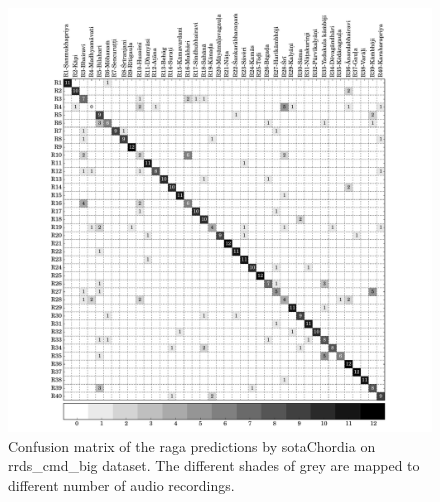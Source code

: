 \begin{figure}
	\begin{center}
		\includegraphics[width=\figSizeHundred]{ch07_ragaRecognition/figures/CM_pcd_cmd.pdf}
	\end{center}
	\caption[Confusion matrix of the classification results by \acrshort{sotaChordia} on \acrshort{rrds_cmd_big}]{Confusion matrix of the \gls{raga} predictions by \acrshort{sotaChordia} on \acrshort{rrds_cmd_big} dataset. The different shades of grey are mapped to different number of audio recordings.}
	\label{fig:confusion_matrix_cmd_chordia}
\end{figure}


